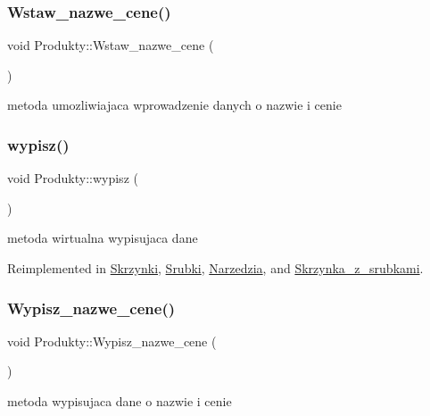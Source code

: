 \subsubsection{\texorpdfstring{Wstaw\+\_\+nazwe\+\_\+cene()}{Wstaw\_nazwe\_cene()}}
{\footnotesize\ttfamily void Produkty\+::\+Wstaw\+\_\+nazwe\+\_\+cene (\begin{DoxyParamCaption}{ }\end{DoxyParamCaption})}

metoda umozliwiajaca wprowadzenie danych o nazwie i cenie \mbox{\label{class_produkty_a720c6591cfbb332f99baccf0f54c4ada}} 
\subsubsection{\texorpdfstring{wypisz()}{wypisz()}}
{\footnotesize\ttfamily void Produkty\+::wypisz (\begin{DoxyParamCaption}{ }\end{DoxyParamCaption})\hspace{0.3cm}{\ttfamily [virtual]}}

metoda wirtualna wypisujaca dane 

Reimplemented in \mbox{\hyperlink{class_skrzynki_adcf60a88ed78fba5a2dfdb54fa82b236}{Skrzynki}}, \mbox{\hyperlink{class_srubki_a0ac1f1ce5748283a13b0f554add73f0b}{Srubki}}, \mbox{\hyperlink{class_narzedzia_a39cd48d9367f3a4e8fcc30878a320338}{Narzedzia}}, and \mbox{\hyperlink{class_skrzynka__z__srubkami_ac543a438ce88bc79a9e8a398b6beff7c}{Skrzynka\+\_\+z\+\_\+srubkami}}.

\mbox{\label{class_produkty_ac38af686bb465b62fd499dec9dd6c246}} 
\subsubsection{\texorpdfstring{Wypisz\+\_\+nazwe\+\_\+cene()}{Wypisz\_nazwe\_cene()}}
{\footnotesize\ttfamily void Produkty\+::\+Wypisz\+\_\+nazwe\+\_\+cene (\begin{DoxyParamCaption}{ }\end{DoxyParamCaption})}

metoda wypisujaca dane o nazwie i cenie \mbox{\label{class_produkty_a49c2ba4084346df8e7c987b9ec62676e}} 
